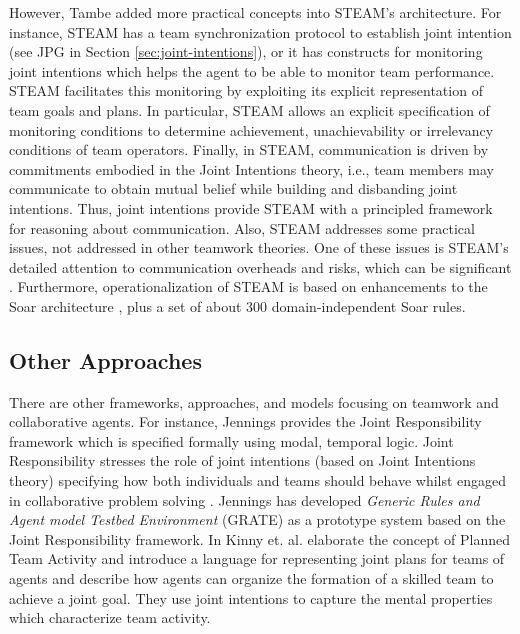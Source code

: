 \documentclass[12pt]{report}
\begin{document}
However, Tambe added more practical concepts into STEAM's architecture. For
instance, STEAM has a team synchronization protocol to establish joint intention
(see JPG in Section \ref{sec:joint-intentions}), or it has constructs for
monitoring joint intentions which helps the agent to be able to monitor team
performance. STEAM facilitates this monitoring by exploiting its explicit
representation of team goals and plans. In particular, STEAM allows an explicit
specification of monitoring conditions to determine achievement, unachievability
or irrelevancy conditions of team operators. Finally, in STEAM, communication is
driven by commitments embodied in the Joint Intentions theory, i.e., team
members may communicate to obtain mutual belief while building and disbanding
joint intentions. Thus, joint intentions provide STEAM with a principled
framework for reasoning about communication. Also, STEAM addresses some
practical issues, not addressed in other teamwork theories. One of these issues
is STEAM's detailed attention to communication overheads and risks, which can be
significant \cite{tambe:agent-archtecture-teamwork}. Furthermore,
operationalization of STEAM is based on enhancements to the Soar architecture
\cite{laird:soar}, plus a set of about 300 domain-independent Soar rules.

\subsection{Other Approaches}

There are other frameworks, approaches, and models focusing on teamwork and
collaborative agents. For instance, Jennings provides the Joint Responsibility
framework which is specified formally using modal, temporal logic. Joint
Responsibility stresses the role of joint intentions (based on Joint Intentions
theory) specifying how both individuals and teams should behave whilst engaged
in collaborative problem solving \cite{jennings:joint-responsibility,
jennings:on-responsible, jennings:joint-intention-hybrid,
jennings:joint-responsibility-dynamic}. Jennings has developed \textit{Generic
Rules and Agent model Testbed Environment} (GRATE) as a prototype system based
on the Joint Responsibility framework. In \cite{kinny:planned-team} Kinny et.
al. elaborate the concept of Planned Team Activity and introduce a language for
representing joint plans for teams of agents and describe how agents can
organize the formation of a skilled team to achieve a joint goal. They use joint
intentions to capture the mental properties which characterize team activity.
\end{document}
